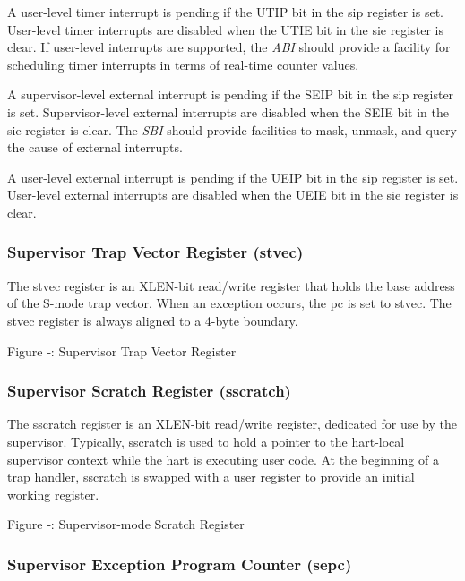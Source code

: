 A user-level timer interrupt is pending if the UTIP bit in the sip
register is set. User-level timer interrupts are disabled when the UTIE
bit in the sie register is clear. If user-level interrupts are
supported, the \emph{ABI} should provide a facility for scheduling timer
interrupts in terms of real-time counter values.

A supervisor-level external interrupt is pending if the SEIP bit in the
sip register is set. Supervisor-level external interrupts are disabled
when the SEIE bit in the sie register is clear. The \emph{SBI} should
provide facilities to mask, unmask, and query the cause of external
interrupts.

A user-level external interrupt is pending if the UEIP bit in the sip
register is set. User-level external interrupts are disabled when the
UEIE bit in the sie register is clear.

\subsubsection{Supervisor Trap Vector Register
(stvec)}\label{supervisor-trap-vector-register-stvec}

The stvec register is an XLEN-bit read/write register that holds the
base address of the S-mode trap vector. When an exception occurs, the pc
is set to stvec. The stvec register is always aligned to a 4-byte
boundary.

\missingfigure{}

Figure ‑: Supervisor Trap Vector Register

\subsubsection{Supervisor Scratch Register (sscratch)
}\label{supervisor-scratch-register-sscratch}

The sscratch register is an XLEN-bit read/write register, dedicated for
use by the supervisor. Typically, sscratch is used to hold a pointer to
the hart-local supervisor context while the hart is executing user code.
At the beginning of a trap handler, sscratch is swapped with a user
register to provide an initial working register.

\missingfigure{}

Figure ‑: Supervisor-mode Scratch Register

\subsubsection{Supervisor Exception Program Counter
(sepc)}\label{supervisor-exception-program-counter-sepc}

